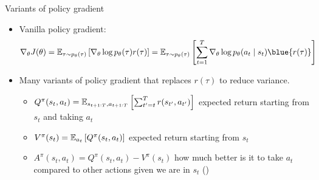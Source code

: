 \documentclass[usenames,dvipsnames,notes,11pt,aspectratio=169,hyperref={colorlinks=true, linkcolor=blue}]{beamer}
\begin{document}
\begin{frame}
    {Variants of policy gradient}
    \begin{itemize}[<+->]
        \item Vanilla policy gradient:
            \begin{align*}
                \nabla_\theta J(\theta) &= \BE_{\tau\sim p_\theta(\tau)}\pb{\nabla_\theta \log p_\theta(\tau) r(\tau)}
                = \BE_{\tau\sim p_\theta(\tau)}\pb{\sum_{t=1}^T   \nabla_\theta \log p_\theta(a_t\mid s_t) \blue{r(\tau)}}
            \end{align*}
        \item Many variants of policy gradient that replaces $r(\tau)$ to reduce variance.
            \begin{itemize}
                \item $Q^\pi(s_t, a_t)=\mathbb{E}_{s_{t+1:T}, a_{t+1:T}}\left[ \sum_{t'=t}^T r(s_{t'}, a_{t'}) \right]$
                    expected return starting from $s_t$ and taking $a_t$
                \item $V^\pi(s_t) = \mathbb{E}_{a_t}\left[ Q^\pi(s_t, a_t) \right]$ 
                    expected return starting from $s_t$
                \item $A^\pi(s_t, a_t) = Q^\pi(s_t, a_t) - V^\pi(s_t)$
                    how much better is it to take $a_t$ compared to other actions given we are in $s_t$ ()
            \end{itemize}
    \end{itemize}
\end{frame}
\end{document}
